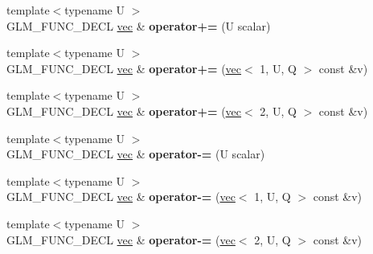 \begin{DoxyCompactItemize}
{\footnotesize template$<$typename U $>$ }\\G\+L\+M\+\_\+\+F\+U\+N\+C\+\_\+\+D\+E\+CL \hyperlink{structglm_1_1vec}{vec} \& {\bfseries operator+=} (U scalar)
\item 
\mbox{\label{structglm_1_1vec_3_012_00_01T_00_01Q_01_4_a1c157e104fcc32dba87fcd6a47457523}} 
{\footnotesize template$<$typename U $>$ }\\G\+L\+M\+\_\+\+F\+U\+N\+C\+\_\+\+D\+E\+CL \hyperlink{structglm_1_1vec}{vec} \& {\bfseries operator+=} (\hyperlink{structglm_1_1vec}{vec}$<$ 1, U, Q $>$ const \&v)
\item 
\mbox{\label{structglm_1_1vec_3_012_00_01T_00_01Q_01_4_aca945ef129a7730690a1b216b5aa67b0}} 
{\footnotesize template$<$typename U $>$ }\\G\+L\+M\+\_\+\+F\+U\+N\+C\+\_\+\+D\+E\+CL \hyperlink{structglm_1_1vec}{vec} \& {\bfseries operator+=} (\hyperlink{structglm_1_1vec}{vec}$<$ 2, U, Q $>$ const \&v)
\item 
\mbox{\label{structglm_1_1vec_3_012_00_01T_00_01Q_01_4_a6961040865246e7250dd6cf13956d09e}} 
{\footnotesize template$<$typename U $>$ }\\G\+L\+M\+\_\+\+F\+U\+N\+C\+\_\+\+D\+E\+CL \hyperlink{structglm_1_1vec}{vec} \& {\bfseries operator-\/=} (U scalar)
\item 
\mbox{\label{structglm_1_1vec_3_012_00_01T_00_01Q_01_4_ad0145e78e71199aad6aa61d5e899f1eb}} 
{\footnotesize template$<$typename U $>$ }\\G\+L\+M\+\_\+\+F\+U\+N\+C\+\_\+\+D\+E\+CL \hyperlink{structglm_1_1vec}{vec} \& {\bfseries operator-\/=} (\hyperlink{structglm_1_1vec}{vec}$<$ 1, U, Q $>$ const \&v)
\item 
\mbox{\label{structglm_1_1vec_3_012_00_01T_00_01Q_01_4_a8051ed9c25b34e08a29f6eee8d0ea3dc}} 
{\footnotesize template$<$typename U $>$ }\\G\+L\+M\+\_\+\+F\+U\+N\+C\+\_\+\+D\+E\+CL \hyperlink{structglm_1_1vec}{vec} \& {\bfseries operator-\/=} (\hyperlink{structglm_1_1vec}{vec}$<$ 2, U, Q $>$ const \&v)
\item 
\mbox{\label{structglm_1_1vec_3_012_00_01T_00_01Q_01_4_a4a645fcc1832d33c8be9c5dfcb4107e8}} 

\end{DoxyCompactItemize}
